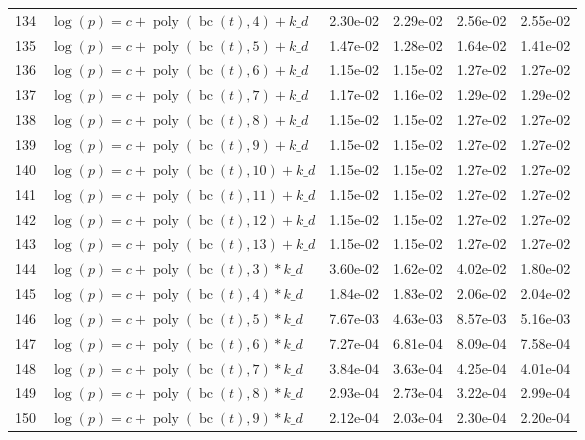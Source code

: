 \documentclass[12pt,a4paper]{article}
\DeclareMathOperator{\bc}{bc}
\DeclareMathOperator{\poly}{poly}
\begin{document}
\begin{longtable}[t]{ll>{\raggedleft\arraybackslash}p{2cm}>{\raggedleft\arraybackslash}p{2cm}>{\raggedleft\arraybackslash}p{2cm}>{\raggedleft\arraybackslash}p{2cm}}
134 & $\log(p) = c + \poly\left( \bc(t), 4 \right) + k\_d$ & 2.30e-02 & 2.29e-02 & 2.56e-02 & 2.55e-02\\
\rowcolor{gray!6}  135 & $\log(p) = c + \poly\left( \bc(t), 5 \right) + k\_d$ & 1.47e-02 & 1.28e-02 & 1.64e-02 & 1.41e-02\\
136 & $\log(p) = c + \poly\left( \bc(t), 6 \right) + k\_d$ & 1.15e-02 & 1.15e-02 & 1.27e-02 & 1.27e-02\\
\rowcolor{gray!6}  137 & $\log(p) = c + \poly\left( \bc(t), 7 \right) + k\_d$ & 1.17e-02 & 1.16e-02 & 1.29e-02 & 1.29e-02\\
138 & $\log(p) = c + \poly\left( \bc(t), 8 \right) + k\_d$ & 1.15e-02 & 1.15e-02 & 1.27e-02 & 1.27e-02\\
\rowcolor{gray!6}  139 & $\log(p) = c + \poly\left( \bc(t), 9 \right) + k\_d$ & 1.15e-02 & 1.15e-02 & 1.27e-02 & 1.27e-02\\
140 & $\log(p) = c + \poly\left( \bc(t), 10 \right) + k\_d$ & 1.15e-02 & 1.15e-02 & 1.27e-02 & 1.27e-02\\
\rowcolor{gray!6}  141 & $\log(p) = c + \poly\left( \bc(t), 11 \right) + k\_d$ & 1.15e-02 & 1.15e-02 & 1.27e-02 & 1.27e-02\\
142 & $\log(p) = c + \poly\left( \bc(t), 12 \right) + k\_d$ & 1.15e-02 & 1.15e-02 & 1.27e-02 & 1.27e-02\\
\rowcolor{gray!6}  143 & $\log(p) = c + \poly\left( \bc(t), 13 \right) + k\_d$ & 1.15e-02 & 1.15e-02 & 1.27e-02 & 1.27e-02\\
144 & $\log(p) = c + \poly\left( \bc(t), 3 \right) * k\_d$ & 3.60e-02 & 1.62e-02 & 4.02e-02 & 1.80e-02\\
\rowcolor{gray!6}  145 & $\log(p) = c + \poly\left( \bc(t), 4 \right) * k\_d$ & 1.84e-02 & 1.83e-02 & 2.06e-02 & 2.04e-02\\
146 & $\log(p) = c + \poly\left( \bc(t), 5 \right) * k\_d$ & 7.67e-03 & 4.63e-03 & 8.57e-03 & 5.16e-03\\
\rowcolor{gray!6}  147 & $\log(p) = c + \poly\left( \bc(t), 6 \right) * k\_d$ & 7.27e-04 & 6.81e-04 & 8.09e-04 & 7.58e-04\\
148 & $\log(p) = c + \poly\left( \bc(t), 7 \right) * k\_d$ & 3.84e-04 & 3.63e-04 & 4.25e-04 & 4.01e-04\\
\rowcolor{gray!6}  149 & $\log(p) = c + \poly\left( \bc(t), 8 \right) * k\_d$ & 2.93e-04 & 2.73e-04 & 3.22e-04 & 2.99e-04\\
150 & $\log(p) = c + \poly\left( \bc(t), 9 \right) * k\_d$ & 2.12e-04 & 2.03e-04 & 2.30e-04 & 2.20e-04\\

\end{longtable}
\end{document}
